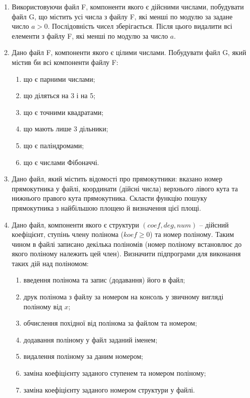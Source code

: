 \documentclass[a5paper,titlepage,openany,twoside,draft]{book_unv}%
\makeatletter
\newcommand{\xslalph}[1]{\expandafter\@xslalph\csname c@#1\endcsname}
\newcommand{\@xslalph}[1]{%
    \ifcase#1\or а\or б\or в\or г\or д\or e\or є\or ж\or з\or i%
    \or й\or к\or л\or м\or н\or о\or п\or р\or с\or т%
    \or у\or ф\or х\or ц\or ч\or ш\or ю\or я\or аа\or бб\or вв%
    \else\@ctrerr\fi%
}
\makeatother
\begin{document}
\begin{enumerate}
\def\labelenumi{\arabic{enumi})}

\item
  Використовуючи файл F, компоненти якого є дійсними числами, побудувати
  файл G, що містить усі числа з файлу F, які менші по модулю за задане число $a>0$.
  Послідовність чисел зберігається. Після цього видалити всі елементи з файлу F, 
  які менші по модулю за число $a$.

\item
  Дано файл F, компоненти якого є цілими числами. Побудувати файл G,
  який містив би всі компоненти файлу F:
\begin{enumerate}[label=\xslalph*)]
\item
що є парними числами; 
\item
 що діляться на 3 і на 5;
\item
що є точними квадратами; 
\item
що мають лише 3 дільники; 
\item
що є паліндромами;
\item
що є числами Фібоначчі.
\end{enumerate}


\item
  Дано файл, який містить відомості про прямокутники: вказано номер
  прямокутника у файлі, координати (дійсні числа) верхнього лівого кута та
  нижнього правого кута прямокутника. Скласти функцію пошуку
  прямокутника з найбільшою площею й визначення цієї площі.
\item
  Дано файл, компоненти якого є структури $(coef, deg, num )$ -- 
дійсний коефіцієнт, ступінь члену полінома ($koef \ge 0$) та номер поліному. 
Таким чином в файлі записано декілька поліномів (номер поліному встановлює
до якого поліному належить цей член).
Визначити підпрограми для
  виконання таких дій над поліномом:

\begin{enumerate}[label=\xslalph*)]
\item
введення полінома та запис (додавання) його в файл; 
\item
друк полінома з файлу за номером на консоль у звичному вигляді поліному від $x$;
\item
обчислення похідної від полінома за файлом та номером;
\item
додавання поліному у файл заданий іменем;
\item
видалення поліному за даним номером;
\item
заміна коефіцієнту заданого ступенем та номером поліному;
\item
заміна коефіцієнту заданого номером структури у файлі.
\end{enumerate}

\end{enumerate}
\end{document}
